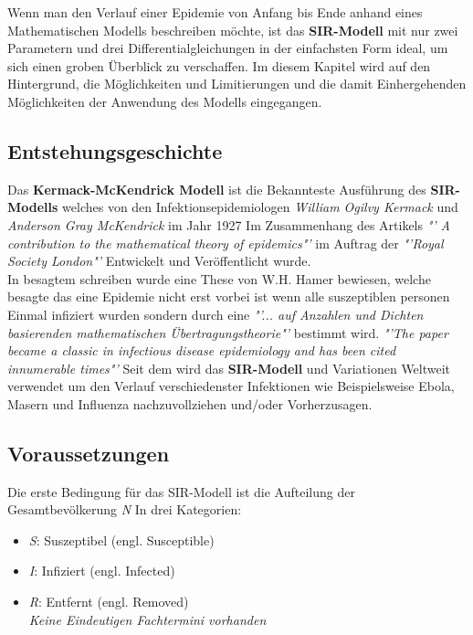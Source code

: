 \documentclass[12pt]{scrartcl} %
\begin{document}
Wenn man den Verlauf einer Epidemie von Anfang bis Ende anhand eines Mathematischen Modells beschreiben möchte, ist das \textbf{SIR-Modell} 
mit nur zwei Parametern und drei Differentialgleichungen in der einfachsten Form ideal, um sich einen groben Überblick zu verschaffen. \cite[vgl.]{4}
Im diesem Kapitel wird auf den Hintergrund, die Möglichkeiten und Limitierungen und die damit Einhergehenden Möglichkeiten der Anwendung des Modells eingegangen.

\subsection{Entstehungsgeschichte}

Das \textbf{Kermack-McKendrick Modell} ist die Bekannteste Ausführung des \textbf{SIR-Modells} welches von den Infektionsepidemiologen \textsl{William Ogilvy Kermack} und \textsl{Anderson Gray McKendrick} im Jahr 1927 Im Zusammenhang des Artikels 
\textsl{"' A contribution to the mathematical theory of epidemics"'} \cite{7}
im Auftrag der \textsl{"'Royal Society London"'} \cite[s. 1]{6} Entwickelt und Veröffentlicht wurde. \cite[vgl.]{6} \\
In besagtem schreiben wurde eine These von W.H. Hamer bewiesen, welche besagte das eine Epidemie nicht erst vorbei ist wenn alle suszeptiblen personen Einmal infiziert wurden sondern durch eine \textsl{"'... auf Anzahlen und Dichten basierenden mathematischen Übertragungstheorie"'} \cite[s. 81]{2} bestimmt wird. \cite{2}
\textsl{"'The paper became a classic in infectious disease epidemiology and has been cited innumerable times"'} \cite[s. 1]{6}
Seit dem wird das \textbf{SIR-Modell} und Variationen Weltweit verwendet um den Verlauf verschiedenster Infektionen
wie Beispielsweise Ebola, Masern und Influenza nachzuvollziehen und/oder Vorherzusagen. \cite[vgl. s. 3]{3}


\subsection{Voraussetzungen}

Die erste Bedingung für das SIR-Modell ist die Aufteilung der Gesamtbevölkerung \textit{N} In drei Kategorien:

\begin{itemize}
	\item \textit{S}: Suszeptibel (engl. Susceptible)
	\item \textit{I}: Infiziert (engl. Infected)
	\item \textit{R}: Entfernt (engl. Removed)\\
	\small \textsl{Keine Eindeutigen Fachtermini vorhanden}
\end{itemize}
\normalsize
\end{document}
